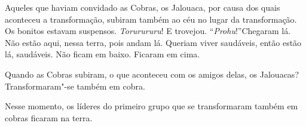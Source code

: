 Aqueles que haviam convidado as Cobras, os Jalouaca, por causa dos quais
aconteceu a transformação, subiram também ao céu no lugar da
transformação. Os bonitos estavam suspensos. \emph{Torurururu}! E
trovejou. ``\emph{Prohu}!''Chegaram lá. Não estão aqui, nessa terra,
pois andam lá. Queriam viver saudáveis, então estão lá, saudáveis. Não
ficam em baixo. Ficaram em cima. 

Quando as Cobras subiram, o que aconteceu com os amigos delas, os
Jalouacas? Transformaram"-se também em cobra. 

Nesse momento, os líderes do primeiro grupo que se transformaram também
em cobras ficaram na terra.

 
